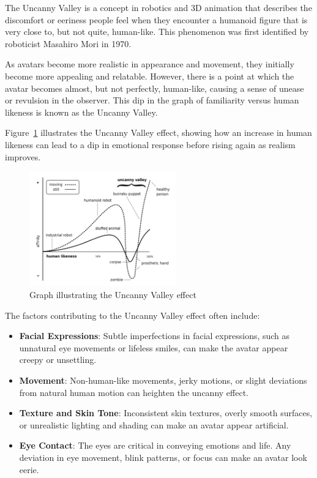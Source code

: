 \documentclass[../../main.tex]{subfiles}
\begin{document}
The Uncanny Valley is a concept in robotics and 3D animation that describes the discomfort or eeriness people feel when they encounter a humanoid figure that is very close to, but not quite, human-like. This phenomenon was first identified by roboticist Masahiro Mori in 1970.

As avatars become more realistic in appearance and movement, they initially become more appealing and relatable. However, there is a point at which the avatar becomes almost, but not perfectly, human-like, causing a sense of unease or revulsion in the observer. This dip in the graph of familiarity versus human likeness is known as the Uncanny Valley.

Figure~\ref{fig:uncanny_valley_graph} illustrates the Uncanny Valley effect, showing how an increase in human likeness can lead to a dip in emotional response before rising again as realism improves.

\begin{figure}
  \centering
  \includegraphics[width = 2.5in]{chapters/background_work/images/uncanny_valley_graph.png}
  \caption{Graph illustrating the Uncanny Valley effect}
  \label{fig:uncanny_valley_graph}
\end{figure}

The factors contributing to the Uncanny Valley effect often include:

\begin{itemize}
  \item \textbf{Facial Expressions}: Subtle imperfections in facial expressions, such as unnatural eye movements or lifeless smiles, can make the avatar appear creepy or unsettling.
  \item \textbf{Movement}: Non-human-like movements, jerky motions, or slight deviations from natural human motion can heighten the uncanny effect.
  \item \textbf{Texture and Skin Tone}: Inconsistent skin textures, overly smooth surfaces, or unrealistic lighting and shading can make an avatar appear artificial.
  \item \textbf{Eye Contact}: The eyes are critical in conveying emotions and life. Any deviation in eye movement, blink patterns, or focus can make an avatar look eerie.
\end{itemize}
\end{document}
